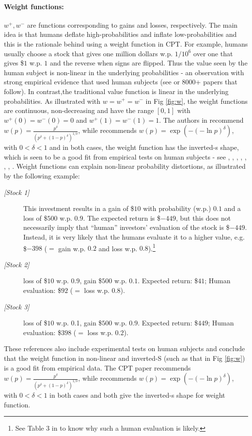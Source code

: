 \documentclass[11pt,letterpaper,english]{article}
\begin{document}
\paragraph{Weight functions:} $w^+, w^-$ are functions corresponding to gains and losses, respectively. 
The main idea is that humans deflate high-probabilities and inflate low-probabilities and this is the rationale behind using a weight function in CPT.
For example, humans usually choose a stock that gives one million dollars w.p. $1/10^6$ over one that gives \$$1$ w.p. $1$ and the reverse when signs are flipped. 
Thus the value seen by the human subject is non-linear in the underlying probabilities - an observation with strong empirical evidence that used human subjects (see \cite{tversky1992advances} or $8000$+ papers that follow).  In contrast,the traditional value function is linear in the underlying probabilities. 
As illustrated with $w=w^+=w^-$ in Fig \ref{fig:w}, the weight functions are continuous, non-decreasing and  have the range $[0,1]$ with $w^+(0)=w^-(0)=0$ and $w^+(1)=w^-(1)=1$. 
The authors in \cite{tversky1992advances} recommend $w(p) = \frac{p^{\delta}}{{(p^{\delta}+ (1-p)^{\delta})}^{1/\delta}}$, while \cite{prelec1998probability} recommends $w(p) = \exp(-(-\ln p)^\delta)$, with $0 < \delta <1$ and in both cases, the weight function has the inverted-s shape, which is seen to be a good fit from empirical tests on human subjects - see \cite{conlisk1989three}, \cite{camerer1989experimental}, \cite{camerer1992recent}, \cite{harless1992predictions}, \cite{sopher1993test}, \cite{camerer1994violations}, \cite{gonzalez1999shape}, \cite{abdellaoui2000parameter}.   
Weight functions can explain non-linear probability distortions, as illustrated by the following example: 
\begin{description}
 \item[\textit{[Stock 1]}] This investment results in a gain of \$$10$ with probability (w.p.) $0.1$ and a loss of \$$500$ w.p. $0.9$. The expected return is \$$-449$, but this does not necessarily imply that ``human'' investors' evaluation of the stock is \$$-449$. Instead, it is very likely that the humans evaluate it to a higher value, e.g. \$$-398$ ($=$ gain w.p. $0.2$ and loss w.p. $0.8$).\footnote{See Table 3 in \cite{tversky1992advances} to know why such a human evaluation is likely.}
\item[\textit{[Stock 2]}] loss of \$$10$ w.p. $0.9$, gain \$$500$ w.p. $0.1$. Expected return: \$$41$; Human evaluation: \$$92$ ($=$ loss w.p. $0.8$).
\item[\textit{[Stock 3]}] loss of \$$10$ w.p. 0.1, gain \$$500$ w.p. $0.9$. Expected return: \$$449$; Human evaluation: \$$398$ ($=$ loss w.p. $0.2$). 
\end{description}
These references also include experimental tests on human subjects and conclude that the weight function in non-linear and  inverted-S (such as that in Fig \ref{fig:w}) is a good fit from empirical data. The CPT paper \cite{tversky1992advances} recommends $w(p) = \frac{p^{\delta}}{{(p^{\delta}+ (1-p)^{\delta})}^{1/\delta}}$, while \cite{prelec1998probability} recommends $w(p) = \exp(-(-\ln p)^\delta)$, with $0 < \delta <1$ in both cases and both give the inverted-s shape for weight function. 
\end{document}
